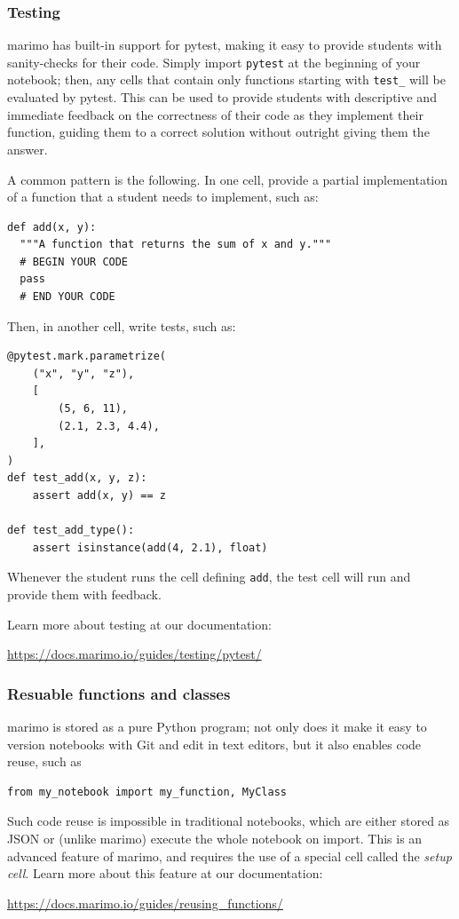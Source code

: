 \documentclass{article}
\begin{document}
\subsubsection{Testing} marimo has built-in support for pytest, making it easy to
provide students with sanity-checks for their code. Simply import \texttt{pytest} 
at the beginning of your notebook; then, any cells that contain only functions starting
with \texttt{test\_} will be evaluated by pytest. This can be used to provide students
with descriptive and immediate feedback on the correctness of their code as they implement
their function, guiding them to a correct solution without outright giving them the answer.

A common pattern is the following. In one cell, provide a partial
implementation of a function that a student needs to implement, such as:

\begin{lstlisting}
def add(x, y):
  """A function that returns the sum of x and y."""
  # BEGIN YOUR CODE
  pass
  # END YOUR CODE
\end{lstlisting}
Then, in another cell, write tests, such as:

\begin{lstlisting}
@pytest.mark.parametrize(
    ("x", "y", "z"),
    [
        (5, 6, 11),
        (2.1, 2.3, 4.4),
    ],
)
def test_add(x, y, z):
    assert add(x, y) == z

def test_add_type():
    assert isinstance(add(4, 2.1), float)
\end{lstlisting}
Whenever the student runs the cell defining \texttt{add}, the test cell will run and provide
them with feedback.

Learn more about testing at our documentation:
\begin{center}
  \url{https://docs.marimo.io/guides/testing/pytest/}
\end{center}

\subsubsection{Resuable functions and classes} marimo is stored as a pure Python program;
not only does it make it easy to version notebooks with Git and edit in text editors,
but it also enables code reuse, such as

\begin{lstlisting}
from my_notebook import my_function, MyClass
\end{lstlisting}
Such code reuse is impossible in traditional notebooks, which are either stored as JSON or
(unlike marimo) execute the whole notebook on import. This is an advanced feature of marimo,
and requires the use of a special cell called the \emph{setup cell}. Learn more
about this feature at our documentation:

\begin{center}
  \url{https://docs.marimo.io/guides/reusing_functions/}
\end{center}
\end{document}
